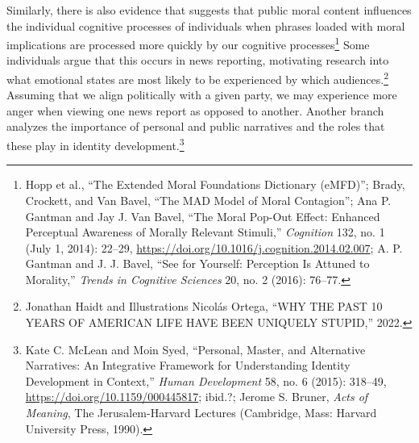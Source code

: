 \documentclass[phdthesis,12pt,final]{wuthesis}
\theoremstyle{definition}
\theoremstyle{definition}
\theoremstyle{definition}
\theoremstyle{definition}
\theoremstyle{remark}
\begin{document}
Similarly, there is also evidence that suggests that public moral content influences the individual cognitive processes of individuals when phrases loaded with moral implications are processed more quickly by our cognitive processes\footnote{Hopp et al., {``The Extended {Moral Foundations Dictionary} ({eMFD})''}; Brady, Crockett, and Van Bavel, {``The {MAD} Model of Moral Contagion''}; Ana P. Gantman and Jay J. Van Bavel, {``The Moral Pop-Out Effect: {Enhanced} Perceptual Awareness of Morally Relevant Stimuli,''} \emph{Cognition} 132, no. 1 (July 1, 2014): 22--29, \url{https://doi.org/10.1016/j.cognition.2014.02.007}; A. P. Gantman and J. J. Bavel, {``See for Yourself: Perception Is Attuned to Morality,''} \emph{Trends in Cognitive Sciences} 20, no. 2 (2016): 76--77.} Some individuals argue that this occurs in news reporting, motivating research into what emotional states are most likely to be experienced by which audiences.\footnote{Jonathan Haidt and Illustrations Nicolás Ortega, {``{WHY THE PAST} 10 {YEARS OF AMERICAN LIFE HAVE BEEN UNIQUELY STUPID},''} 2022.} Assuming that we align politically with a given party, we may experience more anger when viewing one news report as opposed to another. Another branch analyzes the importance of personal and public narratives and the roles that these play in identity development.\footnote{Kate C. McLean and Moin Syed, {``Personal, {Master}, and {Alternative Narratives}: {An Integrative Framework} for {Understanding Identity Development} in {Context},''} \emph{Human Development} 58, no. 6 (2015): 318--49, \url{https://doi.org/10.1159/000445817}; ibid.?; Jerome S. Bruner, \emph{Acts of Meaning}, The {Jerusalem-Harvard} Lectures (Cambridge, Mass: Harvard University Press, 1990).}
\end{document}
